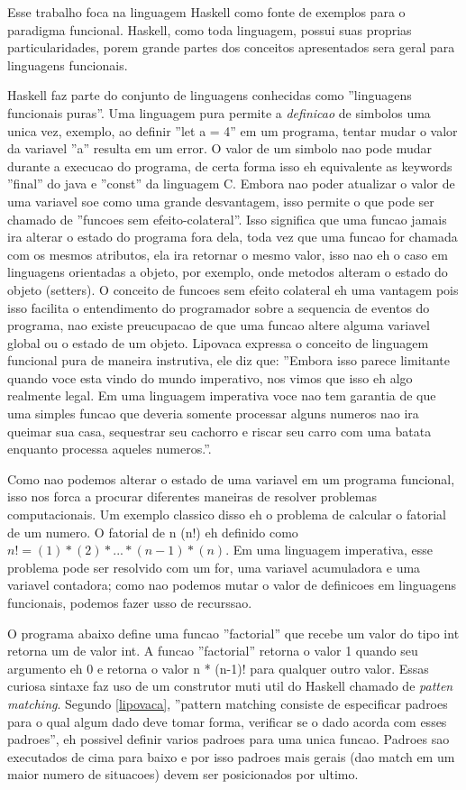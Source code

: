 Esse trabalho foca na linguagem Haskell como fonte de exemplos para o paradigma funcional.
Haskell, como toda linguagem, possui suas proprias particularidades, porem grande partes dos conceitos apresentados sera geral para linguagens funcionais.

Haskell faz parte do conjunto de linguagens conhecidas como ''linguagens funcionais puras''.
Uma linguagem pura permite a \emph{definicao} de simbolos uma unica vez, exemplo, ao definir ''let a = 4'' em um programa, tentar mudar o valor da variavel ''a'' resulta em um error.
O valor de um simbolo nao pode mudar durante a execucao do programa, de certa forma isso eh equivalente as keywords ''final'' do java e ''const'' da linguagem C.
Embora nao poder atualizar o valor de uma variavel soe como uma grande desvantagem, isso permite o que pode ser chamado de ''funcoes sem efeito-colateral''.
Isso significa que uma funcao jamais ira alterar o estado do programa fora dela, toda vez que uma funcao for chamada com os mesmos atributos, ela ira retornar o mesmo valor, isso nao eh o caso em linguagens orientadas a objeto, por exemplo, onde metodos alteram o estado do objeto (setters).
O conceito de funcoes sem efeito colateral eh uma vantagem pois isso facilita o entendimento do programador sobre a sequencia de eventos do programa, nao existe preucupacao de que uma funcao altere alguma variavel global ou o estado de um objeto.
Lipovaca expressa o conceito de linguagem funcional pura de maneira instrutiva, ele diz que:
''Embora isso parece limitante quando voce esta vindo do mundo imperativo, nos vimos que isso eh algo realmente legal. Em uma linguagem imperativa voce nao tem garantia de que uma simples funcao que deveria somente processar alguns numeros nao ira queimar sua casa, sequestrar seu cachorro e riscar seu carro com uma batata enquanto processa aqueles numeros.''.

Como nao podemos alterar o estado de uma variavel em um programa funcional, isso nos forca a procurar diferentes maneiras de resolver problemas computacionais.
Um exemplo classico disso eh o problema de calcular o fatorial de um numero.
O fatorial de n (n!) eh definido como $ n! = (1)*(2)*...*(n-1)*(n)$.
Em uma linguagem imperativa, esse problema pode ser resolvido com um for, uma variavel acumuladora e uma variavel contadora; como nao podemos mutar o valor de definicoes em linguagens funcionais, podemos fazer usso de recurssao.

O programa abaixo define uma funcao ''factorial'' que recebe um valor do tipo int retorna um de valor int.
A funcao ''factorial'' retorna o valor 1 quando seu argumento eh 0 e retorna o valor n * (n-1)! para qualquer outro valor.
Essas curiosa sintaxe faz uso de um construtor muti util do Haskell chamado de \emph{patten matching}.
Segundo \ref{lipovaca}, ''pattern matching consiste de especificar padroes para o qual algum dado deve tomar forma, verificar se o dado acorda com esses padroes'', eh possivel definir varios padroes para uma unica funcao.
Padroes sao executados de cima para baixo e por isso padroes mais gerais (dao match em um maior numero de situacoes) devem ser posicionados por ultimo.

